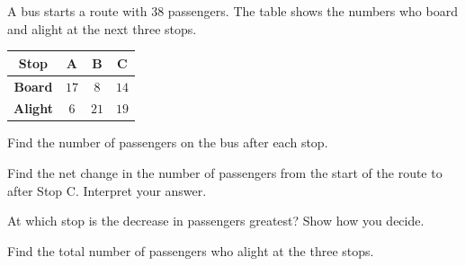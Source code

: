 A bus starts a route with $38$ passengers. The table shows the numbers who board and alight at the next three stops.

\begin{center}
\begin{tabular}{|c|c|c|c|}
\hline
\textbf{Stop} & A & B & C \\
\hline
\textbf{Board} & $17$ & $8$ & $14$ \\
\hline
\textbf{Alight} & $6$ & $21$ & $19$ \\
\hline
\end{tabular}
\end{center}

\begin{subparts}
  \item Find the number of passengers on the bus after each stop.
  \item Find the net change in the number of passengers from the start of the route to after Stop C. Interpret your answer.
  \item At which stop is the decrease in passengers greatest? Show how you decide.
  \item Find the total number of passengers who alight at the three stops.
\end{subparts}

